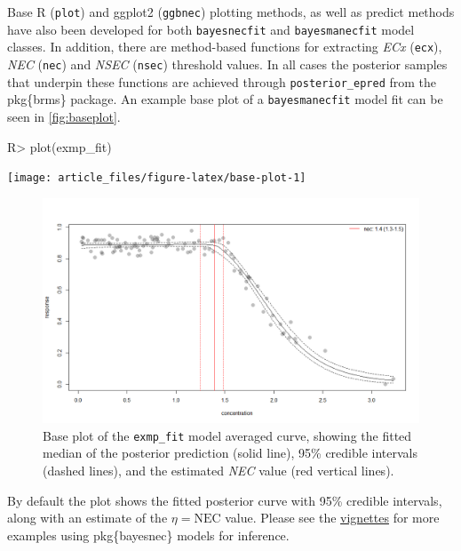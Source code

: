 \documentclass[
]{jss}
\begin{document}
Base R (\texttt{plot}) and ggplot2 (\texttt{ggbnec}) plotting methods,
as well as predict methods have also been developed for both
\texttt{bayesnecfit} and \texttt{bayesmanecfit} model classes. In
addition, there are method-based functions for extracting \emph{ECx}
(\texttt{ecx}), \emph{NEC} (\texttt{nec}) and \emph{NSEC}
(\texttt{nsec}) threshold values. In all cases the posterior samples
that underpin these functions are achieved through
\texttt{posterior\_epred} from the pkg\{brms\} package. An example base
plot of a \texttt{bayesmanecfit} model fit can be seen in
\autoref{fig:baseplot}.

\begin{CodeChunk}
\begin{CodeInput}
R> plot(exmp_fit)
\end{CodeInput}


\begin{center}\texttt{[image: article\_files/figure-latex/base-plot-1]} \end{center}

\end{CodeChunk}

\begin{figure}
\centering
\includegraphics{base_plot.png}
\caption{Base plot of the \texttt{exmp\_fit} model averaged curve,
showing the fitted median of the posterior prediction (solid line), 95\%
credible intervals (dashed lines), and the estimated \emph{NEC} value
(red vertical lines).\label{fig:baseplot}}
\end{figure}

By default the plot shows the fitted posterior curve with 95\% credible
intervals, along with an estimate of the \(\eta = \text{NEC}\) value.
Please see the
\href{https://open-aims.github.io/bayesnec/articles/}{vignettes} for
more examples using pkg\{bayesnec\} models for inference.
\end{document}
